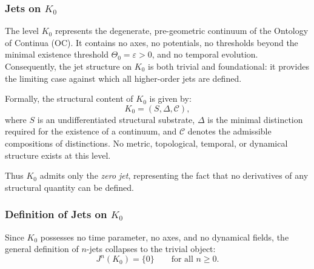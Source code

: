 
\subsubsection{Jets on \texorpdfstring{$K_0$}{K_0}}
\label{sec:jets-k0}

The level $K_0$ represents the degenerate, pre-geometric continuum of the
Ontology of Continua (OC). It contains no axes, no potentials,
no thresholds beyond the minimal existence threshold $\Theta_0=\varepsilon>0$,
and no temporal evolution. Consequently, the jet structure on $K_0$ is
both trivial and foundational: it provides the limiting case against
which all higher-order jets are defined.

\medskip

Formally, the structural content of $K_0$ is given by:
\[
K_0 = (S, \Delta, \mathcal{C}),
\]
where $S$ is an undifferentiated structural substrate,
$\Delta$ is the minimal distinction required for the existence of a
continuum, and $\mathcal{C}$ denotes the admissible compositions of
distinctions. No metric, topological, temporal, or dynamical structure
exists at this level.

Thus $K_0$ admits only the \emph{zero jet}, representing the fact that
no derivatives of any structural quantity can be defined.



\subsubsection{Definition of Jets on \texorpdfstring{\texorpdfstring{$K_0$}{K_0}}{K0}}

Since $K_0$ possesses no time parameter, no axes, and no dynamical fields,
the general definition of $n$-jets collapses to the trivial object:
\[
J^n(K_0) = \{0\}
\qquad \text{for all } n \ge 0.
\]

